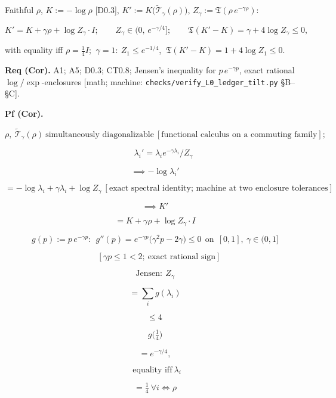 \begin{corollary}\label{tag:L0a}
Faithful $\rho$, $K:=-\log\rho$ [D0.3], $K':=K\bigl(\tilde{\mathcal T}_\gamma(\rho)\bigr)$, $Z_\gamma:=\mathfrak T(\rho\,e^{-\gamma\rho})$:

\[
K'=K+\gamma\rho+\log Z_\gamma\cdot I;\qquad
Z_\gamma\in(0,\,e^{-\gamma/4}];\qquad
\mathfrak T(K'-K)=\gamma+4\log Z_\gamma\le0,
\]

with equality iff $\rho=\tfrac14I$; $\ \gamma=1:\ Z_1\le e^{-1/4}$, $\ \mathfrak T(K'-K)=1+4\log Z_1\le0$.

\textbf{Req (Cor).} A1; A5; D0.3; CT0.8; Jensen's inequality for $p\,e^{-\gamma p}$, exact rational $\log/\exp$-enclosures [math; machine: \texttt{checks/\allowbreak{}verify\_\allowbreak{}L0\_\allowbreak{}ledger\_\allowbreak{}tilt.py} §B–§C].

\textbf{Pf (Cor).}

\[
\rho,\ \tilde{\mathcal T}_\gamma(\rho)\ \text{simultaneously diagonalizable}\ [\text{functional calculus on a commuting family}];
\]

\[
\qquad \lambda_i'=\lambda_ie^{-\gamma\lambda_i}/Z_\gamma
\]

\[
\implies -\log\lambda_i'
\]

\[
= -\log\lambda_i+\gamma\lambda_i+\log Z_\gamma\ [\text{exact spectral identity; machine at two enclosure tolerances}]
\]

\[
\implies K'
\]

\[
= K+\gamma\rho+\log Z_\gamma\cdot I
\]

\[
g(p):=p\,e^{-\gamma p}:\ \ g''(p)=e^{-\gamma p}\bigl(\gamma^2p-2\gamma\bigr)\le0\ \ \text{on}\ \ [0,1],\ \gamma\in(0,1]
\]

\[
\quad [\gamma p\le1<2;\ \text{exact rational sign}]
\]

\[
\text{Jensen}:\ Z_\gamma
\]

\[
= \textstyle\sum_ig(\lambda_i)
\]

\[
\le 4\,
\]

\[
g\bigl(\tfrac14\bigr)
\]

\[
= e^{-\gamma/4},
\]

\[
\ \ \text{equality iff}\ \lambda_i
\]

\[
= \tfrac14\ \forall i\iff\rho
\]


\end{corollary}
